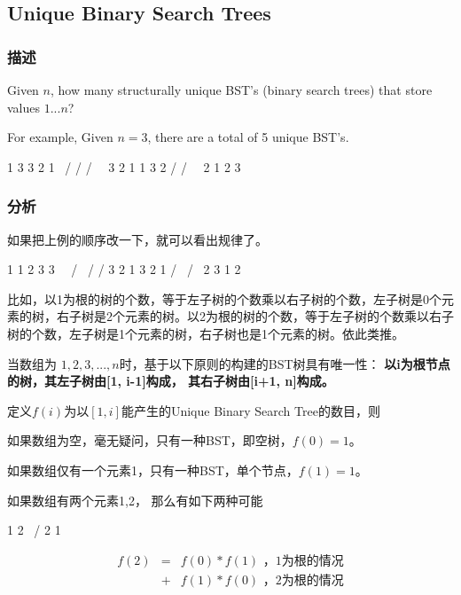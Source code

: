 \subsection{Unique Binary Search Trees}
\label{sec:unique-binary-search-trees}


\subsubsection{描述}
Given $n$, how many structurally unique BST's (binary search trees) that store values $1...n$?

For example,
Given $n = 3$, there are a total of 5 unique BST's.
\begin{Code}
   1         3     3      2      1
    \       /     /      / \      \
     3     2     1      1   3      2
    /     /       \                 \
   2     1         2                 3
\end{Code}

\subsubsection{分析}
如果把上例的顺序改一下，就可以看出规律了。
\begin{Code}
 1       1           2          3       3
  \       \         / \        /       / 
   3       2       1   3      2       1
  /         \                /         \
2            3              1           2
\end{Code}

比如，以1为根的树的个数，等于左子树的个数乘以右子树的个数，左子树是0个元素的树，右子树是2个元素的树。以2为根的树的个数，等于左子树的个数乘以右子树的个数，左子树是1个元素的树，右子树也是1个元素的树。依此类推。

当数组为 $1,2,3,...,n$时，基于以下原则的构建的BST树具有唯一性：
\textbf{以i为根节点的树，其左子树由[1, i-1]构成， 其右子树由[i+1, n]构成。}

定义$f(i)$为以$[1,i]$能产生的Unique Binary Search Tree的数目，则

如果数组为空，毫无疑问，只有一种BST，即空树，$f(0)=1$。

如果数组仅有一个元素{1}，只有一种BST，单个节点，$f(1)=1$。

如果数组有两个元素{1,2}， 那么有如下两种可能
\begin{Code}
1             2
  \          /
    2      1
\end{Code}

\begin{eqnarray}
f(2) &=& f(0) * f(1)   \text{ ，1为根的情况} \nonumber \\
     &+& f(1) * f(0)   \text{ ，2为根的情况} \nonumber
\end{eqnarray}

